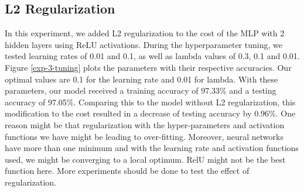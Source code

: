 \documentclass[11pt]{homework}
\begin{document}
\subsection{L2 Regularization}
In this experiment, we added L2 regularization to the cost of the MLP with 2 hidden layers using ReLU activations. During the hyperparameter tuning, we tested learning rates of 0.01 and 0.1, as well as lambda values of 0.3, 0.1 and 0.01. Figure \ref{exp-3-tuning} plots the parameters with their respective accuracies. Our optimal values are 0.1 for the learning rate and 0.01 for lambda. With these parameters, our model received a training accuracy of 97.33\% and a testing accuracy of 97.05\%. Comparing this to the model without L2 regularization, this modification to the cost resulted in a decrease of testing accuracy by 0.96\%. One reason might be that regularization with the hyper-parameters and activation functions we have might be leading to over-fitting. Moreover, neural networks have more than one minimum and with the learning rate and activation functions used, we might be converging to a local optimum. RelU might not be the best function here. More experiments should be done to test the effect of regularization. 
\end{document}

